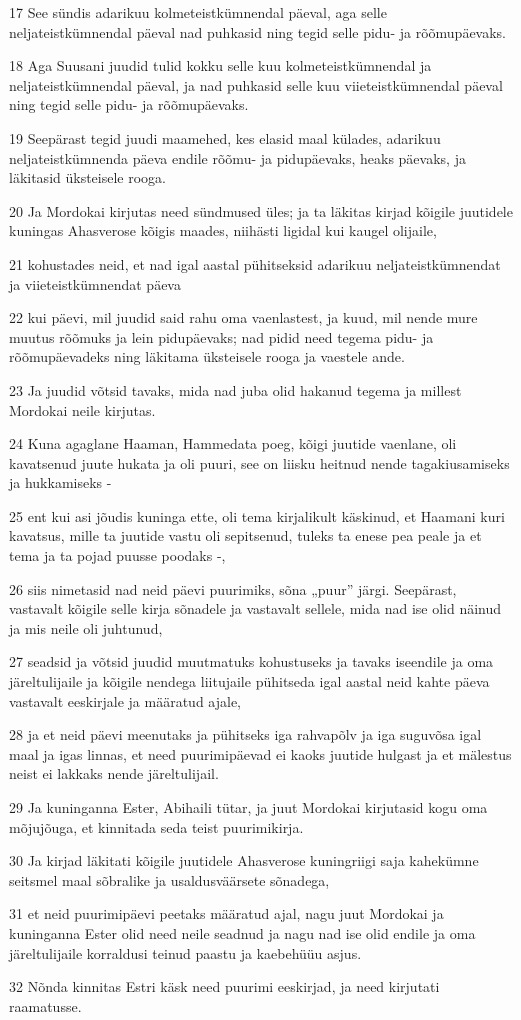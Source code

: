 \par 17 See sündis adarikuu kolmeteistkümnendal päeval, aga selle neljateistkümnendal päeval nad puhkasid ning tegid selle pidu- ja rõõmupäevaks.
\par 18 Aga Suusani juudid tulid kokku selle kuu kolmeteistkümnendal ja neljateistkümnendal päeval, ja nad puhkasid selle kuu viieteistkümnendal päeval ning tegid selle pidu- ja rõõmupäevaks.
\par 19 Seepärast tegid juudi maamehed, kes elasid maal külades, adarikuu neljateistkümnenda päeva endile rõõmu- ja pidupäevaks, heaks päevaks, ja läkitasid üksteisele rooga.
\par 20 Ja Mordokai kirjutas need sündmused üles; ja ta läkitas kirjad kõigile juutidele kuningas Ahasverose kõigis maades, niihästi ligidal kui kaugel olijaile,
\par 21 kohustades neid, et nad igal aastal pühitseksid adarikuu neljateistkümnendat ja viieteistkümnendat päeva
\par 22 kui päevi, mil juudid said rahu oma vaenlastest, ja kuud, mil nende mure muutus rõõmuks ja lein pidupäevaks; nad pidid need tegema pidu- ja rõõmupäevadeks ning läkitama üksteisele rooga ja vaestele ande.
\par 23 Ja juudid võtsid tavaks, mida nad juba olid hakanud tegema ja millest Mordokai neile kirjutas.
\par 24 Kuna agaglane Haaman, Hammedata poeg, kõigi juutide vaenlane, oli kavatsenud juute hukata ja oli puuri, see on liisku heitnud nende tagakiusamiseks ja hukkamiseks -
\par 25 ent kui asi jõudis kuninga ette, oli tema kirjalikult käskinud, et Haamani kuri kavatsus, mille ta juutide vastu oli sepitsenud, tuleks ta enese pea peale ja et tema ja ta pojad puusse poodaks -,
\par 26 siis nimetasid nad neid päevi puurimiks, sõna „puur” järgi. Seepärast, vastavalt kõigile selle kirja sõnadele ja vastavalt sellele, mida nad ise olid näinud ja mis neile oli juhtunud,
\par 27 seadsid ja võtsid juudid muutmatuks kohustuseks ja tavaks iseendile ja oma järeltulijaile ja kõigile nendega liitujaile pühitseda igal aastal neid kahte päeva vastavalt eeskirjale ja määratud ajale,
\par 28 ja et neid päevi meenutaks ja pühitseks iga rahvapõlv ja iga suguvõsa igal maal ja igas linnas, et need puurimipäevad ei kaoks juutide hulgast ja et mälestus neist ei lakkaks nende järeltulijail.
\par 29 Ja kuninganna Ester, Abihaili tütar, ja juut Mordokai kirjutasid kogu oma mõjujõuga, et kinnitada seda teist puurimikirja.
\par 30 Ja kirjad läkitati kõigile juutidele Ahasverose kuningriigi saja kahekümne seitsmel maal sõbralike ja usaldusväärsete sõnadega,
\par 31 et neid puurimipäevi peetaks määratud ajal, nagu juut Mordokai ja kuninganna Ester olid need neile seadnud ja nagu nad ise olid endile ja oma järeltulijaile korraldusi teinud paastu ja kaebehüüu asjus.
\par 32 Nõnda kinnitas Estri käsk need puurimi eeskirjad, ja need kirjutati raamatusse.


